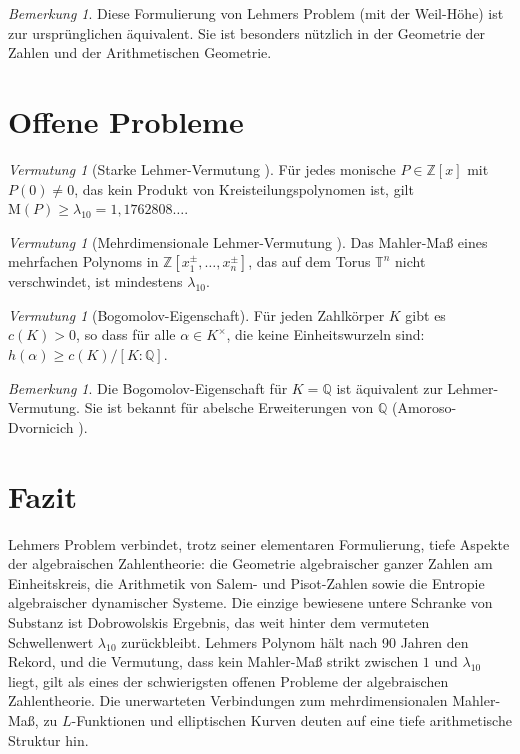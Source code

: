 \documentclass[12pt,a4paper]{amsart}
\theoremstyle{definition}
\theoremstyle{remark}
\newtheorem{bemerkung}[theorem]{Bemerkung}
\newtheorem{vermutung}[theorem]{Vermutung}
\newcommand{\Z}{\mathbb{Z}}
\newcommand{\Q}{\mathbb{Q}}
\newcommand{\T}{\mathbb{T}}
\newcommand{\M}{\mathrm{M}}
\begin{document}
\begin{bemerkung}
  Diese Formulierung von Lehmers Problem (mit der Weil-Höhe) ist zur ursprünglichen
  äquivalent. Sie ist besonders nützlich in der Geometrie der Zahlen und der
  Arithmetischen Geometrie.
\end{bemerkung}

\section{Offene Probleme}\label{sec:offene_probleme}

\begin{vermutung}[Starke Lehmer-Vermutung \cite{Lehmer1933}]
  Für jedes monische $P \in \Z[x]$ mit $P(0) \neq 0$, das kein Produkt von
  Kreisteilungspolynomen ist, gilt $\M(P) \geq \lambda_{10} = 1{,}1762808\ldots$.
\end{vermutung}

\begin{vermutung}[Mehrdimensionale Lehmer-Vermutung \cite{Boyd1981}]
  Das Mahler-Maß eines mehrfachen Polynoms in $\Z[x_1^\pm,\ldots,x_n^\pm]$,
  das auf dem Torus $\T^n$ nicht verschwindet, ist mindestens $\lambda_{10}$.
\end{vermutung}

\begin{vermutung}[Bogomolov-Eigenschaft]
  Für jeden Zahlkörper $K$ gibt es $c(K) > 0$, so dass für alle
  $\alpha \in K^\times$, die keine Einheitswurzeln sind:
  $h(\alpha) \geq c(K)/[K:\Q]$.
\end{vermutung}

\begin{bemerkung}
  Die Bogomolov-Eigenschaft für $K = \Q$ ist äquivalent zur Lehmer-Vermutung.
  Sie ist bekannt für abelsche Erweiterungen von $\Q$
  (Amoroso-Dvornicich \cite{AD2000}).
\end{bemerkung}

\section{Fazit}\label{sec:fazit}

Lehmers Problem verbindet, trotz seiner elementaren Formulierung, tiefe Aspekte der
algebraischen Zahlentheorie: die Geometrie algebraischer ganzer Zahlen am Einheitskreis,
die Arithmetik von Salem- und Pisot-Zahlen sowie die Entropie algebraischer dynamischer
Systeme. Die einzige bewiesene untere Schranke von Substanz ist Dobrowolskis Ergebnis,
das weit hinter dem vermuteten Schwellenwert $\lambda_{10}$ zurückbleibt.
Lehmers Polynom hält nach 90 Jahren den Rekord, und die Vermutung, dass kein Mahler-Maß
strikt zwischen $1$ und $\lambda_{10}$ liegt, gilt als eines der schwierigsten offenen
Probleme der algebraischen Zahlentheorie. Die unerwarteten Verbindungen zum
mehrdimensionalen Mahler-Maß, zu $L$-Funktionen und elliptischen Kurven deuten auf eine
tiefe arithmetische Struktur hin.
\end{document}
